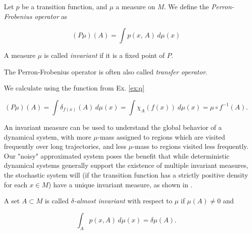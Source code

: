\begin{definition}
    \cite*{attr} Let $p$ be a transition function, and $\mu$ a measure on $M$. 
    We define the \emph{Perron-Frobenius operator} as
    
    \begin{equation}
        (P\mu)(A) = \int p(x,\, A)\ d\mu (x)
    \end{equation}
    
    A measure $\mu$ is called \emph{invariant} if it is a fixed point of $P$.
\end{definition}

\begin{remark}
    The Perron-Frobenius operator is often also called \emph{transfer operator}.
\end{remark}

\begin{example} 
    \label{ex:pushforward}\cite*{attr} We calculate using the function from Ex. \ref{ex:q}

    \begin{equation}
        (P\mu)(A) = \int \delta_{f(x)} (A)\ d\mu (x) 
        = \int \chi_A (f(x))\ d\mu (x) = \mu \circ f^{-1}(A).
    \end{equation}

\end{example}

An invariant measure can be used to understand the global behavior of a dynamical 
system, with more $\mu$-mass assigned to regions which are visited frequently over long
trajectories, and less $\mu$-mass to regions visited less frequently. \\

Our "noisy" approximated system poses the benefit that while deterministic dynamical systems 
generally support the existence of multiple invariant measures, the stochastic system will 
(if the transition function has a strictly positive density for each $x \in M$) have a unique 
invariant measure, as shown in \cite*{lasota}. \\

\begin{definition}
    \cite*{attr}
    A set $A \subset M$ is called \emph{$\delta$-almost invariant} with respect to $\mu$ if 
    $\mu (A) \neq 0$ and 

    \begin{equation}
        \int_A p(x, A)\ d\mu (x) = \delta \mu (A). 
    \end{equation}

\end{definition}

